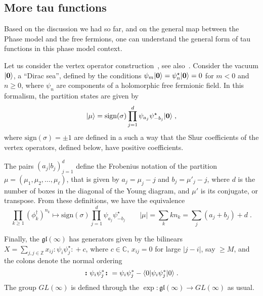 \documentclass[a4paper,11pt]{amsart}
\begin{document}

\subsection{More tau functions}
Based on the discussion we had so far, and on the general map between 
the Phase model and the free fermions, one can understand the general form 
of tau functions in this phase model context. 

Let us consider the vertex operator construction~\cite{Okounkov2001},
see also~\cite{Alexandrov:2012tr, Wheeler:2010vmq}. Consider the
vacuum \(\lvert\bm{0}\rangle\), a ``Dirac sea'', defined by the conditions \(\psi_m\lvert\bm{0}\rangle
= \psi_n^\star\lvert\bm{0}\rangle =0 \) for \(m<0\) and \(n \geq 0\), where 
\(\psi_n\) are components of a holomorphic free fermionic field. 
In this formalism, the partition states are given by 
\begin{equation}
  \lvert\mu\rangle = \textrm{sign}(\sigma) \prod_{j=1}^d \psi_{a_j} \psi^\star_{-b_j}\lvert\bm{0}\rangle\; ,
\end{equation}
where \(\textrm{sign}(\sigma) = \pm 1\) are defined in a such a way
that the Shur coefficients of the vertex operators, defined below,
have positive coefficients.

The pairs \((a_j|b_j)_{j=1}^d\) define the Frobenius notation of the
partition \(\mu = (\mu_1, \mu_2, \dots, \mu_\ell)\), that is given by
\(a_j = \mu_j - j\) and \(b_j = \mu'_j - j\), where \(d\) is the
number of boxes in the diagonal of the Young diagram, and \(\mu'\) is
its conjugate, or transpose.  From these definitions, we have the
equivalence
\begin{equation}
  \prod_{k\geq 1} (\phi_k^\dagger)^{n_k} \mapsto \textrm{sign}(\sigma) \prod_{j=1}^d
  \psi_{a_j} \psi^\star_{-b_j} \qquad |\mu| = \sum_k k n_k = \sum_j(a_j + b_j) + d\; .
\end{equation}

Finally, the \(\mathfrak{gl}(\infty)\) has generators given by the
bilinears \(X = \sum_{j, j \in \mathbb{Z}} x_{ij} \bm{\colon} \psi_i \psi_j^\star\bm{\colon}
+ c\), where \(c\in \mathbb{C}\), \(x_{ij} =
0\) for large \(|j -i|\), say \(\geq M\), and the colons denote the normal ordering
\begin{equation}
  \bm{\colon} \psi_i \psi_j^\ast \bm{\colon} =  \psi_i \psi_j^\ast
  - \langle0\rvert \psi_i \psi_j^\ast \lvert0\rangle \; .
\end{equation}
The group \(GL(\infty)\) is defined through the \(\exp:
\mathfrak{gl}(\infty) \to GL(\infty)\) as usual.
\end{document}
